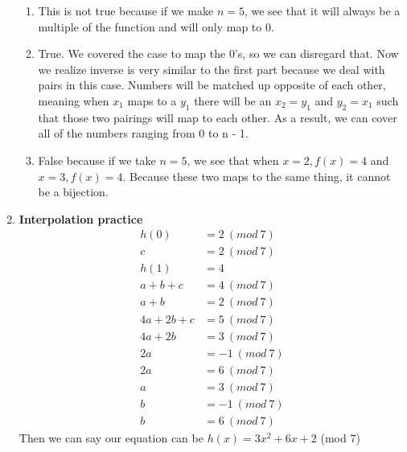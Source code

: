\documentclass[12pt,fleqn]{article}
\begin{document}
\begin{enumerate}
\begin{enumerate}
    \item 
    This is not true because if we make $n = 5$, we see that it will always be a multiple of the function and will only map to 0. 
    
    \item 
    True. We covered the case to map the 0's, so we can disregard that. Now we realize inverse is very similar to the first part because we deal with pairs in this case. Numbers will be matched up opposite of each other, meaning when $x_1$ maps to a $y_1$ there will be an $x_2 = y_1$ and $y_2 = x_1$ such that those two pairings will map to each other. As a result, we can cover all of the numbers ranging from 0 to n - 1. 
    
    \item 
    False because if we take $n = 5$, we see that when $x = 2, f(x) = 4$ and $x = 3, f(x) = 4$. Because these two maps to the same thing, it cannot be a bijection. 
    
  \end{enumerate}
  
  
  \newpage
  \item \textbf{Interpolation practice}
  \begin{align*}
  	h(0) &= 2 \: (mod \: 7) \\
  	c &= 2 \: (mod \: 7) \\
  	h(1) &= 4 \\
  	a + b + c &= 4 \: (mod \: 7) \\
  	a + b &= 2 \: (mod \: 7) \\
  	4a + 2b + c &= 5 \: (mod \: 7) \\
  	4a + 2b &= 3 \: (mod \: 7) \\
  	2a &= -1 \: (mod \: 7) \\
  	2a &= 6 \: (mod \: 7) \\ 
  	a &= 3 \: (mod \: 7) \\
  	b &= -1 \: (mod \: 7) \\
  	b &= 6 \: (mod \: 7)
  \end{align*}
	Then we can say our equation can be $h(x) = 3x^2 + 6x + 2$ (mod 7)  
  

\end{enumerate}
\end{document}
